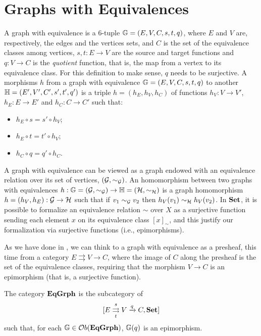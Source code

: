 \section{Graphs with Equivalences}\label{sect:eq_graphs}
A graph with equivalence is a 6-tuple $\mathbb{G} =  (E, V, C, s, t, q)$, where $E$ and $V$ are, respectively, the edges and the vertices sets, and $C$ is the set of the equivalence classes among vertices, $s,t : E \to V$ are the source and target functions and $q: V \to C$ is the \emph{quotient} function, that is, the map from a vertex to its equivalence class. For this definition to make sense, $q$ needs to be surjective. A morphisms $h$ from a graph with equivalence $\mathbb{G} =  (E, V, C, s, t, q)$ to another $\mathbb{H} = (E', V', C', s', t',  q')$ is a triple $h = (h_E, h_V, h_C)$ of functions $h_V : V \to V'$, $h_E : E \to E'$ and $h_C : C \to C'$ such that:
\begin{itemize}
    \item $h_E \circ s = s' \circ h_V$;
    \item $h_E \circ t = t' \circ h_V$;
    \item $h_C \circ q = q' \circ h_C$.
\end{itemize}

\begin{remark}
     A graph with equivalence can be viewed as a graph endowed with an equivalence relation over its set of vertices, $(\mathcal{G}, \sim_{\mathcal{G}})$. An homomorphism between two graphs with equivalences $h :\mathbb{G} = (\mathcal{G}, \sim_{\mathcal{G}})\rightarrow \mathbb{H} = (\mathcal{H}, \sim_{\mathcal{H}})$ is a graph homomorphism $h = (h_V, h_E):\mathcal{G} \rightarrow \mathcal{H}$ such that if $v_1 \sim_{\mathcal{G}} v_2$ then $h_V(v_1) \sim_{\mathcal{H}} h_V(v_2)$. In $\mathbf{Set}$, it is possible to formalize an equivalence relation $\sim$ over $X$ as a surjective function sending each element $x$ on its equivalence class $[x]_{\sim}$, and this justify our formalization via surjective functions (i.e., epimorphisms).
\end{remark}

As we have done in , we can think to a graph with equivalence as a presheaf, this time from a category $E \rightrightarrows V \rightarrow C$, where the image of $C$ along the presheaf is the set of the equivalence classes, requiring that the morphism $V\rightarrow C$ is an epimorphism (that is, a surjective function).

\begin{definition}\label{def:eq_grphs}
    The category $\mathbf{EqGrph}$ is the subcategory of $$[E \mathrel{\mathop{\rightrightarrows}^{s}_{t}} V \xrightarrow{q} C, \mathbf{Set}]$$ such that, for each $\mathbb{G} \in \mathcal{O}b(\mathbf{EqGrph})$, $\mathbb{G}(q)$ is an epimorphism. 
\end{definition}

